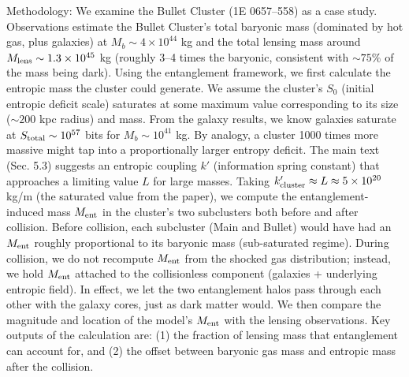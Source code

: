 \documentclass[11pt]{article}
\begin{document}
Methodology: We examine the Bullet Cluster (1E 0657–558) as a case study. Observations estimate the Bullet Cluster’s total baryonic mass (dominated by hot gas, plus galaxies) at $M_b \sim 4\times10^{44}$ kg and the total lensing mass around $M_{\rm lens}\sim 1.3\times10^{45}$ kg (roughly 3–4 times the baryonic, consistent with $\sim 75\%$ of the mass being dark). Using the entanglement framework, we first calculate the entropic mass the cluster could generate. We assume the cluster’s $S_0$ (initial entropic deficit scale) saturates at some maximum value corresponding to its size ($\sim 200$ kpc radius) and mass. From the galaxy results, we know galaxies saturate at $S_{\rm total}\sim 10^{57}$ bits for $M_b\sim 10^{41}$ kg. By analogy, a cluster 1000 times more massive might tap into a proportionally larger entropy deficit. The main text (Sec. 5.3) suggests an entropic coupling $k'$ (information spring constant) that approaches a limiting value $L$ for large masses. Taking $k'_{\rm cluster}\approx L \approx 5\times10^{20}$ kg/m (the saturated value from the paper)​, we compute the entanglement-induced mass $M_{\rm ent}$ in the cluster’s two subclusters both before and after collision. Before collision, each subcluster (Main and Bullet) would have had an $M_{\rm ent}$ roughly proportional to its baryonic mass (sub-saturated regime). During collision, we do not recompute $M_{\rm ent}$ from the shocked gas distribution; instead, we hold $M_{\rm ent}$ attached to the collisionless component (galaxies + underlying entropic field). In effect, we let the two entanglement halos pass through each other with the galaxy cores, just as dark matter would. We then compare the magnitude and location of the model’s $M_{\rm ent}$ with the lensing observations. Key outputs of the calculation are: (1) the fraction of lensing mass that entanglement can account for, and (2) the offset between baryonic gas mass and entropic mass after the collision.
\end{document}
